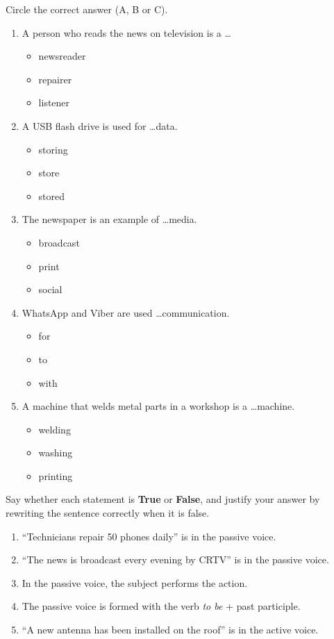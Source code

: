 \documentclass[11pt]{article}
\begin{document}
\begin{exercice}
Circle the correct answer (A, B or C).

\begin{enumerate}
\item A person who reads the news on television is a \ldots
\begin{itemize}
\item[A.] newsreader \item[B.] repairer \item[C.] listener
\end{itemize}
\item A USB flash drive is used for \ldots data.
\begin{itemize}
\item[A.] storing \item[B.] store \item[C.] stored
\end{itemize}
\item The newspaper is an example of \ldots media.
\begin{itemize}
\item[A.] broadcast \item[B.] print \item[C.] social
\end{itemize}
\item WhatsApp and Viber are used \ldots communication.
\begin{itemize}
\item[A.] for \item[B.] to \item[C.] with
\end{itemize}
\item A machine that welds metal parts in a workshop is a \ldots machine.
\begin{itemize}
\item[A.] welding \item[B.] washing \item[C.] printing
\end{itemize}
\end{enumerate}
\end{exercice}

\begin{exercice}
Say whether each statement is \textbf{True} or \textbf{False}, and justify your answer by rewriting the sentence correctly when it is false.

\begin{enumerate}
\item ``Technicians repair 50 phones daily'' is in the passive voice.
\item ``The news is broadcast every evening by CRTV'' is in the passive voice.
\item In the passive voice, the subject performs the action.
\item The passive voice is formed with the verb \emph{to be} + past participle.
\item ``A new antenna has been installed on the roof'' is in the active voice.
\end{enumerate}
\end{exercice}
\end{document}
